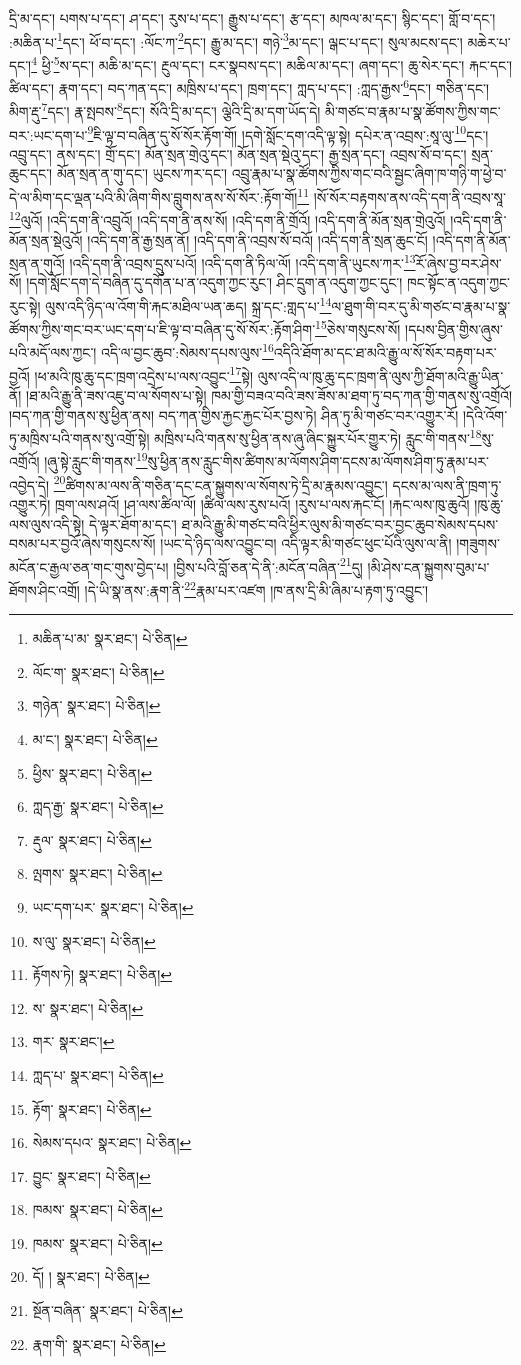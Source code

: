 དྲི་མ་དང་། པགས་པ་དང་། ཤ་དང་། རུས་པ་དང་། རྒྱུས་པ་དང་། རྩ་དང་། མཁལ་མ་དང་། སྙིང་དང་། གློ་བ་དང་། :མཆིན་པ་\footnote{མཆིན་པ་མ་  སྣར་ཐང་།  པེ་ཅིན། }དང་། ཕོ་བ་དང་། :ལོང་ཀ་\footnote{ལོང་ག་  སྣར་ཐང་།  པེ་ཅིན། }དང་། རྒྱུ་མ་དང་། གཉེ་\footnote{གཉེན་  སྣར་ཐང་།  པེ་ཅིན། }མ་དང་། ལྒང་པ་དང་། སུལ་མངས་དང་། མཆེར་པ་དང་།\footnote{མ་ང་།  སྣར་ཐང་།  པེ་ཅིན། } ཕྱི་\footnote{ཕྱིས་  སྣར་ཐང་།  པེ་ཅིན། }ས་དང་། མཆི་མ་དང་། རྔུལ་དང་། ངར་སྣབས་དང་། མཆིལ་མ་དང་། ཞག་དང་། ཆུ་སེར་དང་། རྐང་དང་། ཚིལ་དང་། རྣག་དང་། བད་ཀན་དང་། མཁྲིས་པ་དང་། ཁྲག་དང་། ཀླད་པ་དང་། :ཀླད་རྒྱས་\footnote{ཀླད་རྒྱ་  སྣར་ཐང་།  པེ་ཅིན། }དང་། གཅིན་དང་། མིག་རྡུ་\footnote{རྡུལ་  སྣར་ཐང་།  པེ་ཅིན། }དང་། རྣ་སྤབས་\footnote{ལྤགས་  སྣར་ཐང་།  པེ་ཅིན། }དང་། སོའི་དྲི་མ་དང་། ལྕེའི་དྲི་མ་དག་ཡོད་དེ། མི་གཙང་བ་རྣམ་པ་སྣ་ཚོགས་ཀྱིས་གང་བར་:ཡང་དག་པ་\footnote{ཡང་དག་པར་  སྣར་ཐང་།  པེ་ཅིན། }ཇི་ལྟ་བ་བཞིན་དུ་སོ་སོར་རྟོག་གོ། །དགེ་སློང་དག་འདི་ལྟ་སྟེ། དཔེར་ན་འབྲས་:སཱ་ལུ་\footnote{ས་ལུ་  སྣར་ཐང་།  པེ་ཅིན། }དང་། འབྲུ་དང་། ནས་དང་། གྲོ་དང་། མོན་སྲན་གྲེའུ་དང་། མོན་སྲན་སྡེའུ་དང་། རྒྱ་སྲན་དང་། འབྲས་སོ་བ་དང་། སྲན་ཆུང་དང་། མོན་སྲན་ན་གུ་དང་། ཡུངས་ཀར་དང་། འབྲུ་རྣམ་པ་སྣ་ཚོགས་ཀྱིས་གང་བའི་སྦྱང་ཞིག་ཁ་གཉི་ག་ཕྱེ་བ་དེ་ལ་མིག་དང་ལྡན་པའི་མི་ཞིག་གིས་བླུགས་ནས་སོ་སོར་:རྟོག་གོ།\footnote{རྟོགས་ཏེ།  སྣར་ཐང་།  པེ་ཅིན། } །སོ་སོར་བརྟགས་ནས་འདི་དག་ནི་འབྲས་སཱ་\footnote{ས་  སྣར་ཐང་།  པེ་ཅིན། }ལུའོ། །འདི་དག་ནི་འབྲུའོ། །འདི་དག་ནི་ནས་སོ། །འདི་དག་ནི་གྲོའོ། །འདི་དག་ནི་མོན་སྲན་གྲེའུའོ། །འདི་དག་ནི་མོན་སྲན་སྡེའུའོ། །འདི་དག་ནི་རྒྱ་སྲན་ནོ། །འདི་དག་ནི་འབྲས་སོ་བའོ། །འདི་དག་ནི་སྲན་ཆུང་ངོ། །འདི་དག་ནི་མོན་སྲན་ན་གུའོ། །འདི་དག་ནི་འབྲས་དྲུས་པའོ། །འདི་དག་ནི་ཏིལ་ལོ། །འདི་དག་ནི་ཡུངས་ཀར་\footnote{གར་  སྣར་ཐང་། }རོ་ཞེས་བྱ་བར་ཤེས་སོ། །དགེ་སློང་དག་དེ་བཞིན་དུ་དགོན་པ་ན་འདུག་ཀྱང་རུང་། ཤིང་དྲུག་ན་འདུག་ཀྱང་དུང་། ཁང་སྟོང་ན་འདུག་ཀྱང་རུང་སྟེ། ལུས་འདི་ཉིད་ལ་འོག་གི་རྐང་མཐིལ་ཡན་ཆད། སྐྲ་དང་:གླད་པ་\footnote{ཀླད་པ་  སྣར་ཐང་།  པེ་ཅིན། }ལ་ཐུག་གི་བར་དུ་མི་གཙང་བ་རྣམ་པ་སྣ་ཚོགས་ཀྱིས་གང་བར་ཡང་དག་པ་ཇི་ལྟ་བ་བཞིན་དུ་སོ་སོར་:རྟོག་ཤིག་\footnote{རྟོག་  སྣར་ཐང་།  པེ་ཅིན། }ཅེས་གསུངས་སོ། །དཔས་བྱིན་གྱིས་ཞུས་པའི་མདོ་ལས་ཀྱང་། འདི་ལ་བྱང་ཆུབ་:སེམས་དཔས་ལུས་\footnote{སེམས་དཔའ་  སྣར་ཐང་།  པེ་ཅིན། }འདིའི་ཐོག་མ་དང་ཐ་མའི་རྒྱུ་ལ་སོ་སོར་བརྟག་པར་བྱའོ། །ཕ་མའི་ཁུ་ཆུ་དང་ཁྲག་འདྲེས་པ་ལས་འབྱུང་\footnote{བྱུང་  སྣར་ཐང་།  པེ་ཅིན། }སྟེ། ལུས་འདི་ལ་ཁུ་ཆུ་དང་ཁྲག་ནི་ལུས་ཀྱི་ཐོག་མའི་རྒྱུ་ཡིན་ནོ། །ཐ་མའི་རྒྱུ་ནི་ཟས་འཇུ་བ་ལ་སོགས་པ་སྟེ། ཁམ་གྱི་བཟའ་བའི་ཟས་ཟོས་མ་ཐག་ཏུ་བད་ཀན་གྱི་གནས་སུ་འགྲོའོ། །བད་ཀན་གྱི་གནས་སུ་ཕྱིན་ནས། བད་ཀན་གྱིས་རྐྱང་རྐྱང་པོར་བྱས་ཏེ། ཤིན་ཏུ་མི་གཙང་བར་འགྱུར་རོ། །དེའི་འོག་ཏུ་མཁྲིས་པའི་གནས་སུ་འགྲོ་སྟེ། མཁྲིས་པའི་གནས་སུ་ཕྱིན་ནས་ཞུ་ཞིང་སྐྱུར་པོར་གྱུར་ཏེ། རླུང་གི་གནས་\footnote{ཁམས་  སྣར་ཐང་།  པེ་ཅིན། }སུ་འགྲོའོ། །ཞུ་སྟེ་རླུང་གི་གནས་\footnote{ཁམས་  སྣར་ཐང་།  པེ་ཅིན། }སུ་ཕྱིན་ནས་རླུང་གིས་ཚིགས་མ་ལོགས་ཤིག་དངས་མ་ལོགས་ཤིག་ཏུ་རྣམ་པར་འབྱེད་དེ། \footnote{དོ། །   སྣར་ཐང་།  པེ་ཅིན། }ཚིགས་མ་ལས་ནི་གཅིན་དང་ངན་སྐྱུགས་ལ་སོགས་ཏེ་དྲི་མ་རྣམས་འབྱུང་། དངས་མ་ལས་ནི་ཁྲག་ཏུ་འགྱུར་ཏེ། ཁྲག་ལས་ཤའོ། །ཤ་ལས་ཚིལ་ལོ། །ཚིལ་ལས་རུས་པའོ། །རུས་པ་ལས་རྐང་ངོ། །རྐང་ལས་ཁུ་ཆུའོ། །ཁུ་ཆུ་ལས་ལུས་འདི་སྟེ། དེ་ལྟར་ཐོག་མ་དང་། ཐ་མའི་རྒྱུ་མི་གཙང་བའི་ཕྱིར་ལུས་མི་གཙང་བར་བྱང་ཆུབ་སེམས་དཔས་བསམ་པར་བྱའོ་ཞེས་གསུངས་སོ། །ཡང་དེ་ཉིད་ལས་འབྱུང་བ། འདི་ལྟར་མི་གཙང་ཕུང་པོའི་ལུས་ལ་ནི། །གཟུགས་མངོན་ང་རྒྱལ་ཅན་གང་གུས་བྱེད་པ། །བྱིས་པའི་བློ་ཅན་དེ་ནི་:མངོན་བཞིན་\footnote{སྔོན་བཞིན་  སྣར་ཐང་།  པེ་ཅིན། }དུ། །མི་ཤེས་ངན་སྐྱུགས་བུམ་པ་ཐོགས་ཤིང་འགྲོ། །དེ་ཡི་སྣ་ནས་:རྣག་ནི་\footnote{རྣག་གི་  སྣར་ཐང་།  པེ་ཅིན། }རྣམ་པར་འཛག །ཁ་ནས་དྲི་མི་ཞིམ་པ་རྟག་ཏུ་འབྱུང་། 